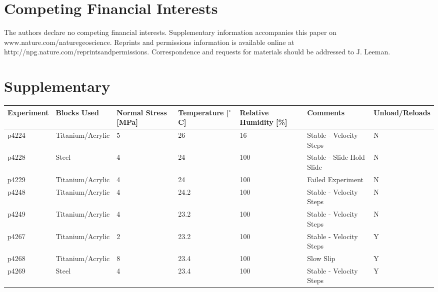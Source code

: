 \documentclass[11pt]{article}
\begin{document}
\section{Competing Financial Interests}
The authors declare no competing financial interests. Supplementary information
accompanies this paper on www.nature.com/naturegeoscience. Reprints and permissions information is
available online at http://npg.nature.com/reprintsandpermissions. Correspondence
and requests for materials should be addressed to J. Leeman.

\newpage
\section{Supplementary}

\small
\begin{center}
    \begin{tabular}{ | l l p{1.6cm} p{1.7cm} p{1.6cm} p{4cm} p{0.5cm} | }
\hline
Experiment & Blocks Used & Normal Stress [MPa] & Temperature [$^\circ$C] & Relative Humidity [\%] & Comments & Unload/Reloads \\
\hline
p4224      & Titanium/Acrylic & 5                   & 26              & 16                    & Stable - Velocity Steps         & N              \\
p4228      & Steel            & 4                   & 24              & 100                   & Stable - Slide Hold Slide       & N              \\
p4229      & Titanium/Acrylic & 4                   & 24              & 100                   & Failed Experiment               & N              \\
p4248      & Titanium/Acrylic & 4                   & 24.2            & 100                   & Stable - Velocity Steps         & N              \\
p4249      & Titanium/Acrylic & 4                   & 23.2            & 100                   & Stable - Velocity Steps         & N              \\
p4267      & Titanium/Acrylic & 2                   & 23.2            & 100                   & Stable - Velocity Steps         & Y              \\
p4268      & Titanium/Acrylic & 8                   & 23.4            & 100                   & Slow Slip                       & Y              \\
p4269      & Steel            & 4                   & 23.4            & 100                   & Stable - Velocity Steps         & Y              \\

\end{tabular}
\end{center}
\end{document}
